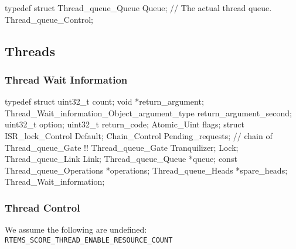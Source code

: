\begin{nicec}
typedef struct {
  Thread_queue_Queue Queue; // The actual thread queue.
} Thread_queue_Control;
\end{nicec}



\newpage

\subsection{Threads}

\subsubsection{Thread Wait Information}


\begin{nicec}
typedef struct {
  uint32_t              count;
  void                 *return_argument;
  Thread_Wait_information_Object_argument_type
                        return_argument_second;
  uint32_t              option;
  uint32_t              return_code;
  Atomic_Uint           flags;
  struct {
    ISR_lock_Control Default;
    Chain_Control Pending_requests; // chain of Thread_queue_Gate !!
    Thread_queue_Gate Tranquilizer;
  } Lock;
  Thread_queue_Link Link;
  Thread_queue_Queue *queue;
  const Thread_queue_Operations *operations;
  Thread_queue_Heads *spare_heads;
}  Thread_Wait_information;
\end{nicec}

\newpage
\subsubsection{Thread Control}

We assume the following are undefined:
\\ \verb"RTEMS_SCORE_THREAD_ENABLE_RESOURCE_COUNT"


